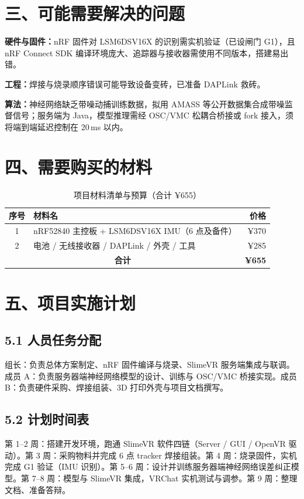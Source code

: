 \documentclass[UTF8,11pt,a4paper]{ctexart}
\begin{document}
\section{三、可能需要解决的问题}
\textbf{硬件与固件：}nRF 固件对 LSM6DSV16X 的识别需实机验证（已设闸门 G1），且 nRF Connect SDK 编译环境庞大、追踪器与接收器需使用不同版本，搭建易出错。

\textbf{工程：}焊接与烧录顺序错误可能导致设备变砖，已准备 DAPLink 救砖。

\textbf{算法：}神经网络缺乏带噪动捕训练数据，拟用 AMASS 等公开数据集合成带噪监督信号；服务端为 Java，模型推理需经 OSC/VMC 松耦合桥接或 fork 接入，须将端到端延迟控制在 20\,ms 以内。

\section{四、需要购买的材料}

\begin{table}[H]
\centering
\small
\caption{项目材料清单与预算（合计 ¥655）}
\label{tab:materials}
\begin{tabular}{clr}
\toprule
\textbf{序号} & \textbf{材料名} & \textbf{价格} \\
\midrule
1 & nRF52840 主控板 + LSM6DSV16X IMU（6 点及备件） & ¥370 \\
2 & 电池 / 无线接收器 / DAPLink / 外壳 / 工具 & ¥285 \\
\midrule
\multicolumn{2}{c}{\textbf{合计}} & \textbf{¥655} \\
\bottomrule
\end{tabular}
\end{table}

\section{五、项目实施计划}

\subsection{5.1 人员任务分配}
组长：负责总体方案制定、nRF 固件编译与烧录、SlimeVR 服务端集成与联调。成员 A：负责服务器端神经网络模型的设计、训练与 OSC/VMC 桥接实现。成员 B：负责硬件采购、焊接组装、3D 打印外壳与项目文档撰写。

\subsection{5.2 计划时间表}
第 1–2 周：搭建开发环境，跑通 SlimeVR 软件四链（Server / GUI / OpenVR 驱动）。第 3 周：采购物料并完成 6 点 tracker 焊接组装。第 4 周：烧录固件，实机完成 G1 验证（IMU 识别）。第 5–6 周：设计并训练服务器端神经网络误差纠正模型。第 7–8 周：模型与 SlimeVR 集成，VRChat 实机测试与调参。第 9 周：整理文档、准备答辩。
\end{document}
